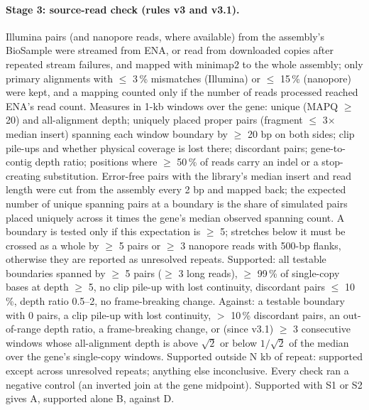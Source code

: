 \documentclass[11pt]{article}
\begin{document}
\paragraph{Stage 3: source-read check (rules v3 and v3.1).} Illumina pairs (and nanopore reads, where available) from the
assembly's BioSample were streamed from ENA, or read from downloaded copies after repeated stream failures, and mapped with
minimap2 to the whole assembly; only primary alignments with $\leq$ 3\,\% mismatches (Illumina) or $\leq$ 15\,\% (nanopore)
were kept, and a mapping counted only if the number of reads processed reached ENA's read count. Measures in 1-kb windows
over the gene: unique (MAPQ $\geq$ 20) and all-alignment depth; uniquely placed proper pairs (fragment $\leq$ 3$\times$ median
insert) spanning each window boundary by $\geq$ 20 bp on both sides; clip pile-ups and whether physical coverage is lost
there; discordant pairs; gene-to-contig depth ratio; positions where $\geq$ 50\,\% of reads carry an indel or a stop-creating
substitution. Error-free pairs with the library's median insert and read length were cut from the assembly every 2 bp and
mapped back; the expected number of unique spanning pairs at a boundary is the share of simulated pairs placed uniquely
across it times the gene's median observed spanning count. A boundary is tested only if this expectation is $\geq$ 5;
stretches below it must be crossed as a whole by $\geq$ 5 pairs or $\geq$ 3 nanopore reads with 500-bp flanks, otherwise they
are reported as unresolved repeats. Supported: all testable boundaries spanned by $\geq$ 5 pairs ($\geq$ 3 long reads),
$\geq$ 99\,\% of single-copy bases at depth $\geq$ 5, no clip pile-up with lost continuity, discordant pairs $\leq$ 10\,\%,
depth ratio 0.5--2, no frame-breaking change. Against: a testable boundary with 0 pairs, a clip pile-up with lost
continuity, $>$ 10\,\% discordant pairs, an out-of-range depth ratio, a frame-breaking change, or (since v3.1) $\geq$ 3
consecutive windows whose all-alignment depth is above $\sqrt{2}$ or below $1/\sqrt{2}$ of the median over the gene's
single-copy windows. Supported outside N kb of repeat: supported except across unresolved repeats; anything else
inconclusive. Every check ran a negative control (an inverted join at the gene midpoint). Supported with S1 or S2 gives A,
supported alone B, against D.
\end{document}
